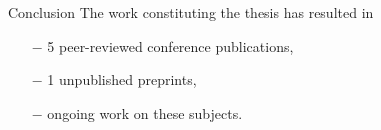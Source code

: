 \documentclass[../talk.tex]{subfiles}
\begin{document}
\begin{frame}{Conclusion}
        The work constituting the thesis has resulted in
        \begin{itemize}
            \item[$-$] 5 peer-reviewed conference publications,
            \item[$-$] 1 unpublished preprints,
            \item[$-$] ongoing work on these subjects.
        \end{itemize}
\end{frame}
\end{document}
